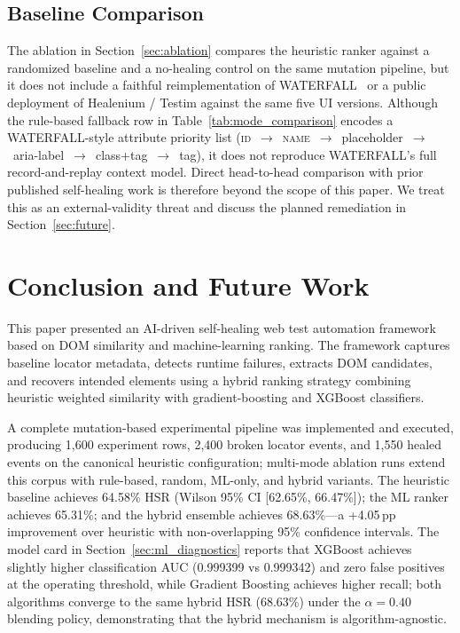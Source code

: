 \documentclass[conference]{IEEEtran}
\begin{document}
\subsection{Baseline Comparison}
The ablation in Section~\ref{sec:ablation} compares the heuristic ranker against a randomized baseline and a no-healing control on the same mutation pipeline, but it does not include a faithful reimplementation of WATERFALL~\cite{hammoudi2016} or a public deployment of Healenium / Testim against the same five UI versions. Although the rule-based fallback row in Table~\ref{tab:mode_comparison} encodes a WATERFALL-style attribute priority list (\textsc{id}~$\to$~\textsc{name}~$\to$~placeholder~$\to$~aria-label~$\to$~class+tag~$\to$~tag), it does not reproduce WATERFALL's full record-and-replay context model. Direct head-to-head comparison with prior published self-healing work is therefore beyond the scope of this paper. We treat this as an external-validity threat and discuss the planned remediation in Section~\ref{sec:future}.


\section{Conclusion and Future Work}
\label{sec:conclusion}
\label{sec:future}

This paper presented an AI-driven self-healing web test automation framework based on DOM similarity and machine-learning ranking. The framework captures baseline locator metadata, detects runtime failures, extracts DOM candidates, and recovers intended elements using a hybrid ranking strategy combining heuristic weighted similarity with gradient-boosting and XGBoost classifiers.

A complete mutation-based experimental pipeline was implemented and executed, producing 1{,}600 experiment rows, 2{,}400 broken locator events, and 1{,}550 healed events on the canonical heuristic configuration; multi-mode ablation runs extend this corpus with rule-based, random, ML-only, and hybrid variants. The heuristic baseline achieves 64.58\% HSR (Wilson 95\% CI [62.65\%, 66.47\%]); the ML ranker achieves 65.31\%; and the hybrid ensemble achieves 68.63\%---a +4.05\,pp improvement over heuristic with non-overlapping 95\% confidence intervals. The model card in Section~\ref{sec:ml_diagnostics} reports that XGBoost achieves slightly higher classification AUC (0.999399 vs 0.999342) and zero false positives at the operating threshold, while Gradient Boosting achieves higher recall; both algorithms converge to the same hybrid HSR (68.63\%) under the $\alpha = 0.40$ blending policy, demonstrating that the hybrid mechanism is algorithm-agnostic.
\end{document}
